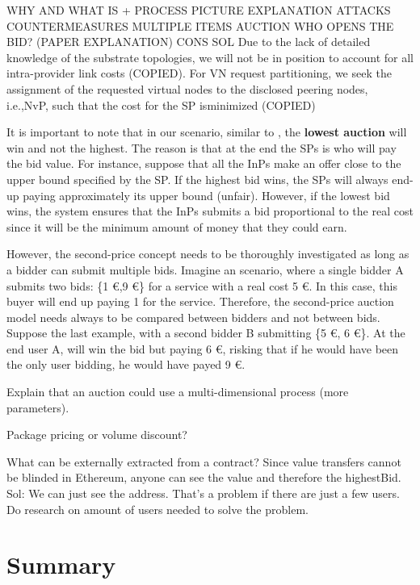 WHY AND WHAT IS + PROCESS PICTURE EXPLANATION
ATTACKS COUNTERMEASURES \citep{boyd2000security}
MULTIPLE ITEMS AUCTION \citep{ausubel2006lovely}
WHO OPENS THE BID? (PAPER EXPLANATION) \citep{ausubel2006lovely}
CONS
SOL
Due to the lack of detailed knowledge of the substrate topologies, we will not be in position to account for all intra-provider link costs (COPIED).
For VN request partitioning, we seek the assignment of the requested virtual nodes to the disclosed peering nodes, i.e.,NvP, such that the cost for the SP isminimized (COPIED)


It is important to note that in our scenario, similar to \citep{zaheer2010multi}, the \textbf{lowest auction} will win and not the highest. The reason is that at the end the SPs is who will pay the bid value. For instance, suppose that all the InPs make an offer close to the upper bound specified by the SP. If the highest bid wins, the SPs will always end-up paying approximately its upper bound (unfair). However, if the lowest bid wins, the system ensures that the InPs submits a bid proportional to the real cost since it will be the minimum amount of money that they could earn.

However, the second-price concept needs to be thoroughly investigated as long as a bidder can submit multiple bids. Imagine an scenario, where a single bidder A submits two bids: \{1 \euro,9 \euro\} for a service with a real cost 5 \euro. In this case, this buyer will end up paying 1 for the service. Therefore, the second-price auction model needs always to be compared between bidders and not between bids. Suppose the last example, with a second bidder B submitting \{5 \euro, 6 \euro\}. At the end user A, will win the bid but paying 6 \euro, risking that if he would have been the only user bidding, he would have payed 9 \euro.

Explain that an auction could use a multi-dimensional process (more parameters).

Package pricing or volume discount?

What can be externally extracted from a contract? Since value transfers cannot be blinded in Ethereum, anyone can see the value and therefore the highestBid. Sol: We can just see the address. That's a problem if there are just a few users. Do research on amount of users needed to solve the problem.

\section{Summary}

